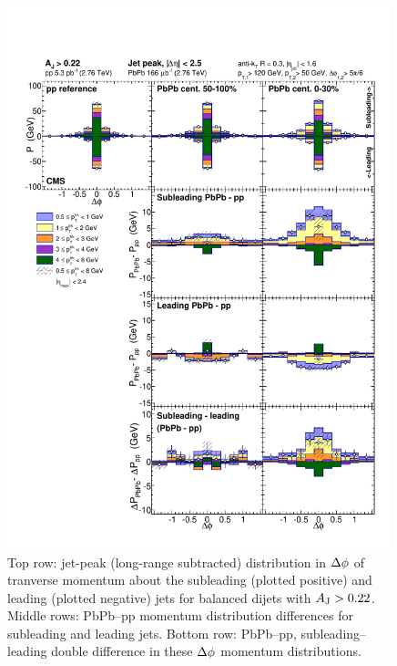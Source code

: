 \begin{figure}[hbt]
\begin{center} 
\includegraphics[width=0.99\textwidth]{figures/Results/Missing_pT_JetRelated_Aj22_Aj75.pdf}
\caption[Jet peak subleading-to-leading momentum balance for unbalanced dijets]{Top row:  jet-peak (long-range subtracted) distribution in $\protect\Delta\phi$ of tranverse momentum about the subleading (plotted positive) and leading (plotted negative) jets for balanced dijets with $A_{\rm J} > 0.22$.  Middle rows:  PbPb--pp momentum distribution differences for subleading and leading jets.  Bottom row:  PbPb--pp, subleading--leading double difference in these $\protect\Delta\phi$ momentum distributions.}
\label{fig:MpT_jetrelated_Aj22_Aj75} 
\end{center} 
\end{figure} 

\clearpage

